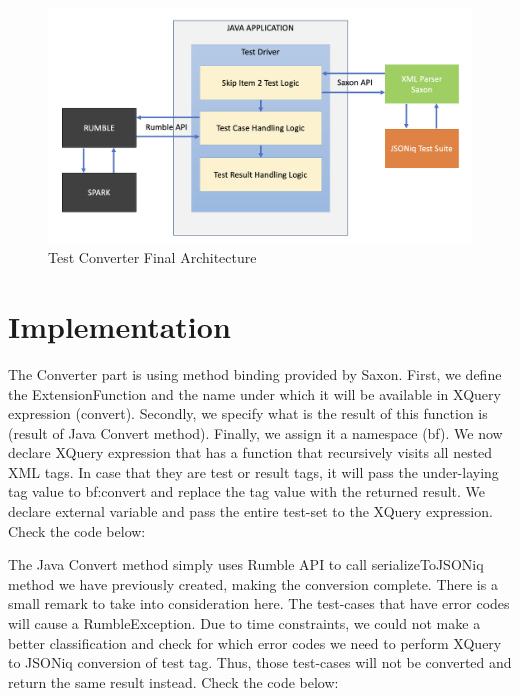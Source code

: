 \begin{figure}[h!]
	\vspace*{-5mm}
	\includegraphics[width=\linewidth]{test_driver_final_architecture.png}
	\vspace*{-8mm}
	\caption{Test Converter Final Architecture}
	\label{fig:test_driver_final_architecture.png}
\end{figure}

\section{Implementation}
The Converter part is using method binding provided by Saxon. First, we define the ExtensionFunction and the name under which it will be available in XQuery expression (convert). Secondly, we specify what is the result of this function is (result of Java Convert method). Finally, we assign it a namespace (bf). We now declare XQuery expression that has a function that recursively visits all nested XML tags. In case that they are test or result tags, it will pass the under-laying tag value to bf:convert and replace the tag value with the returned result. We declare external variable and pass the entire test-set to the XQuery expression. Check the code below:



The Java Convert method simply uses Rumble API to call serializeToJSONiq method we have previously created, making the conversion complete. There is a small remark to take into consideration here. The test-cases that have error codes will cause a RumbleException. Due to time constraints, we could not make a better classification and check for which error codes we need to perform XQuery to JSONiq conversion of test tag. Thus, those test-cases will not be converted and return the same result instead. Check the code below:

